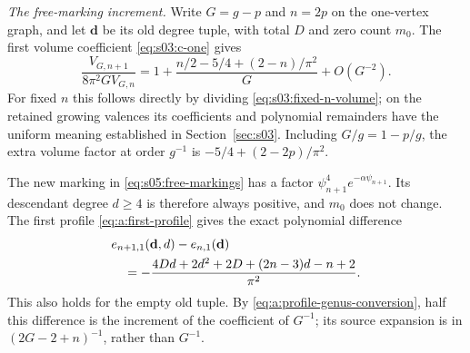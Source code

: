 \begin{prf}
\emph{The free-marking increment.}
Write $G=g-p$ and $n=2p$ on the one-vertex graph, and let
$\mathbf d$ be its old degree tuple, with total $D$ and zero count
$m_0$. The first volume coefficient \eqref{eq:s03:c-one} gives
\begin{equation}\label{eq:s05:one-mark-volume}
 \frac{V_{G,n+1}}{8\pi^2G V_{G,n}}
 =1+\frac{n/2-5/4+(2-n)/\pi^2}{G}+O(G^{-2}).
\end{equation}
For fixed $n$ this follows directly by dividing
\eqref{eq:s03:fixed-n-volume}; on the retained growing valences its
coefficients and polynomial remainders have the uniform meaning
established in Section~\ref{sec:s03}. Including $G/g=1-p/g$, the
extra volume factor at order $g^{-1}$ is
$-5/4+(2-2p)/\pi^2$.

The new marking in \eqref{eq:s05:free-markings} has a factor
$\psi_{n+1}^4e^{-\alpha\psi_{n+1}}$. Its descendant degree
$d\geq4$ is therefore always positive, and $m_0$ does not change.
The first profile \eqref{eq:a:first-profile} gives the exact
polynomial difference
\begin{align}
 &e_{n+1,1}(\mathbf d,d)-e_{n,1}(\mathbf d)\notag\\
 &\quad=-\frac{4Dd+2d^2+2D+(2n-3)d-n+2}{\pi^2}.
 \label{eq:s05:profile-increment}
\end{align}
This also holds for the empty old tuple. By
\eqref{eq:a:profile-genus-conversion}, half this difference is the
increment of the coefficient of $G^{-1}$; its source expansion is
in $(2G-2+n)^{-1}$, rather than $G^{-1}$.


\end{prf}
